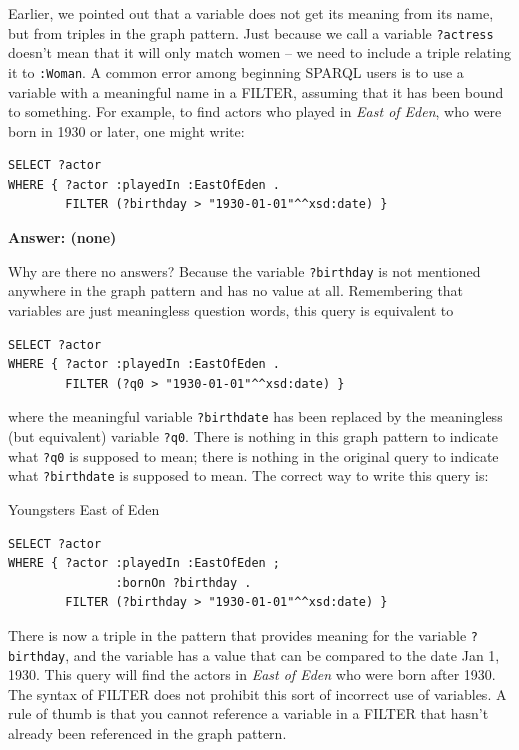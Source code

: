 Earlier, we pointed out that a variable does not get its meaning from
its name, but from triples in the graph pattern. Just because we call a
variable \texttt{?actress} doesn't mean that it will only match women -- we need
to include a triple relating it to \texttt{:Woman}. A common error among
beginning SPARQL users is to use a variable with a meaningful name in a
FILTER, assuming that it has been bound to something. For example, to
find actors who played in \emph{East of Eden}, who were born in 1930 or
later, one might write:



\begin{lstlisting}
SELECT ?actor
WHERE { ?actor :playedIn :EastOfEden .
        FILTER (?birthday > "1930-01-01"^^xsd:date) }
\end{lstlisting}

\textbf{\textbf{Answer:} (none)}

Why are there no answers? Because the variable \texttt{?birthday} is not
mentioned anywhere in the graph pattern and has no value at all.
Remembering that variables are just meaningless question words, this
query is equivalent to


\begin{lstlisting}
SELECT ?actor
WHERE { ?actor :playedIn :EastOfEden .
        FILTER (?q0 > "1930-01-01"^^xsd:date) }
\end{lstlisting}

where the meaningful variable \texttt{?birthdate} has been replaced by the
meaningless (but equivalent) variable \texttt{?q0}. There is nothing in this
graph pattern to indicate what \texttt{?q0} is supposed to mean; there is nothing
in the original query to indicate what \texttt{?birthdate} is supposed to mean.
The correct way to write this query is:

\begin{query}Youngsters East of Eden\end{query}
\begin{lstlisting}
SELECT ?actor
WHERE { ?actor :playedIn :EastOfEden ;
               :bornOn ?birthday .
        FILTER (?birthday > "1930-01-01"^^xsd:date) }
\end{lstlisting}

There is now a triple in the pattern that provides meaning for the
variable \texttt{?birthday}, and the variable has a value that can be compared to
the date Jan 1, 1930. This query will find the actors in \emph{East of
Eden} who were born after 1930. The syntax of FILTER does not prohibit
this sort of incorrect use of variables. A rule of thumb is that you
cannot reference a variable in a FILTER that hasn't already been
referenced in the graph pattern.

